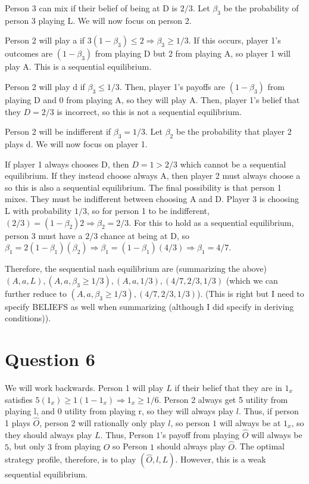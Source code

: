 \documentclass[11pt]{article} %
\begin{document}
Person 3 can mix if their belief of being at D is $2/3$. Let $\beta_3$ be the probability of person 3 playing L. We will now focus on person 2.

Person 2 will play a if $3(1-\beta_3)\leq 2 \Rightarrow \beta_3\geq 1/3.$ If this occurs, player 1's outcomes are $(1-\beta_3)$ from playing D but 2 from playing A, so player 1 will play A. This is a sequential equilibrium.

Person 2 will play d if $\beta_3\leq 1/3.$ Then, player 1's payoffs are $(1-\beta_3)$ from playing D and 0 from playing A, so they will play A. Then, player 1's belief that they $D=2/3$ is incorrect, so this is not a sequential equilibrium.

Person 2 will be indifferent if $\beta_3 = 1/3$. Let $\beta_2$ be the probability that player 2 plays d. We will now focus on player 1.

If player 1 always chooses D, then $D=1>2/3$ which cannot be a sequential equilibrium. If they instead choose always A, then player 2 must always choose a so this is also a sequential equilibrium. The final possibility is that person 1 mixes. They must be indifferent between choosing A and D. Player 3 is choosing L with probability $1/3$, so for person 1 to be indifferent, $(2/3) =  (1-\beta_2)2 \Rightarrow \beta_2 = 2/3$. For this to hold as a sequential equilibrium, person 3 must have a $2/3$ chance at being at D, so $\beta_1 = 2(1-\beta_1)(\beta_2) \Rightarrow \beta_1 = (1-\beta_1)(4/3) \Rightarrow \beta_1 = 4/7.$

Therefore, the sequential nash equilibrium are (summarizing the above) $(A,a,L),(A,a,\beta_3\geq1/3),(A,a,1/3),(4/7,2/3,1/3)$ (which we can further reduce to $(A,a,\beta_3\geq1/3),(4/7,2/3,1/3)$). (This is right but I need to specify BELIEFS as well when summarizing (although I did specify in deriving conditions)).
\section{Question 6}
We will work backwards. Person 1 will play $L$ if their belief that they are in $1_x$ satisfies $5(1_x) \geq 1(1-1_x) \Rightarrow 1_x \geq 1/6$. Person 2 always get 5 utility from playing l, and 0 utility from playing r, so they will always play $l$. Thus, if person 1 plays $\hat{O}$, person 2 will rationally only play $l$, so person $1$  will always be at $1_x$, so they should always play $L$. Thus, Person $1$'s payoff from playing $\hat{O}$ will always be $5$, but only $3$ from playing $O$ so Person $1$ should always play $\hat{O}$. The optimal strategy profile, therefore, is to play $(\hat{O},l,L)$. However, this is a weak sequential equilibrium.
\end{document}
